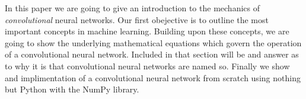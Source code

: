 \startsubject[title=Introduction]
In this paper we are going to give an introduction to the mechanics of {\em convolutional} neural networks.
Our first obejective is to outline the most important concepts in machine learning.
Building upon these concepts, we are going to show the underlying mathematical equations which govern the operation of a convolutional neural network.
Included in that section will be and answer as to why it is that convolutional neural networks are named so.
Finally we show and implimentation of a convolutional neural network from scratch using nothing but Python with the NumPy library.
\stopsubject